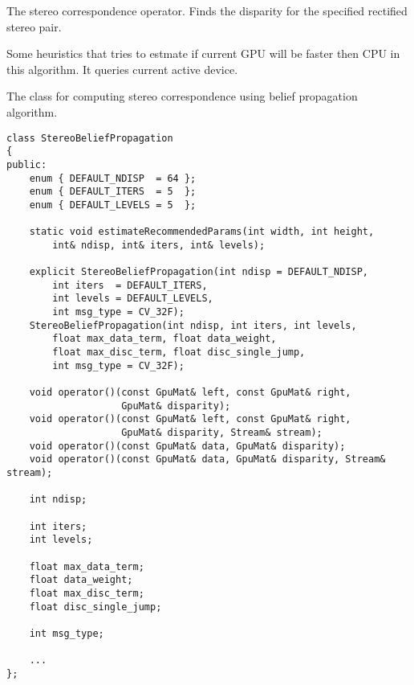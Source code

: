 \label{cppfunc.gpu.StereoBM.operator()}
The stereo correspondence operator. Finds the disparity for the specified rectified stereo pair.


\begin{description}
\end{description}


\label{cppfunc.gpu.StereoBM.checkIfGpuCallReasonable}
Some heuristics that tries to estmate if current GPU will be faster then CPU in this algorithm. It queries current active device.



The class for computing stereo correspondence using belief propagation algorithm.

\begin{lstlisting}
class StereoBeliefPropagation
{
public:
    enum { DEFAULT_NDISP  = 64 };
    enum { DEFAULT_ITERS  = 5  };
    enum { DEFAULT_LEVELS = 5  };

    static void estimateRecommendedParams(int width, int height, 
        int& ndisp, int& iters, int& levels);

    explicit StereoBeliefPropagation(int ndisp = DEFAULT_NDISP,
        int iters  = DEFAULT_ITERS,
        int levels = DEFAULT_LEVELS,
        int msg_type = CV_32F);
    StereoBeliefPropagation(int ndisp, int iters, int levels,
        float max_data_term, float data_weight,
        float max_disc_term, float disc_single_jump,
        int msg_type = CV_32F);

    void operator()(const GpuMat& left, const GpuMat& right, 
                    GpuMat& disparity);
    void operator()(const GpuMat& left, const GpuMat& right, 
                    GpuMat& disparity, Stream& stream);
    void operator()(const GpuMat& data, GpuMat& disparity);
    void operator()(const GpuMat& data, GpuMat& disparity, Stream& stream);

    int ndisp;

    int iters;
    int levels;

    float max_data_term;
    float data_weight;
    float max_disc_term;
    float disc_single_jump;

    int msg_type;

    ...
};
\end{lstlisting}

